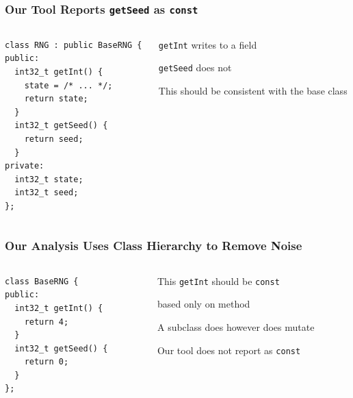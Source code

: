\documentclass[aspectratio=169]{beamer}
\begin{document}
  \begin{frame}[fragile]
    \frametitle{Our Tool Reports \texttt{getSeed} as \texttt{const}}

    \begin{columns}
      \begin{column}{0.4\textwidth}
        \begin{lstlisting}
class RNG : public BaseRNG {
public:
  int32_t getInt() {
    state = /* ... */;
    return state;
  }
  int32_t getSeed() {
    return seed;
  }
private:
  int32_t state;
  int32_t seed;
};
        \end{lstlisting}
      \end{column}
      \begin{column}{0.5\textwidth}
        \texttt{getInt} writes to a field

        \vspace{1em}

        \texttt{getSeed} does not 

        \vspace{4em}

        This should be consistent with the base class
      \end{column}
    \end{columns}
  \end{frame}

  \begin{frame}[fragile]
    \frametitle{Our Analysis Uses Class Hierarchy to Remove Noise}
    \begin{columns}
      \begin{column}{0.4\textwidth}
        \begin{lstlisting}
class BaseRNG {
public:
  int32_t getInt() {
    return 4;
  }
  int32_t getSeed() {
    return 0;
  }
};
        \end{lstlisting}
      \end{column}
      \begin{column}{0.5\textwidth}
        This \texttt{getInt} should be \texttt{const}

        \hspace{1em} based only on method

        \vspace{2em}

        A subclass does however does mutate

        \hspace{1em} Our tool does not report as \texttt{const}
      \end{column}
    \end{columns}
  \end{frame}
\end{document}
